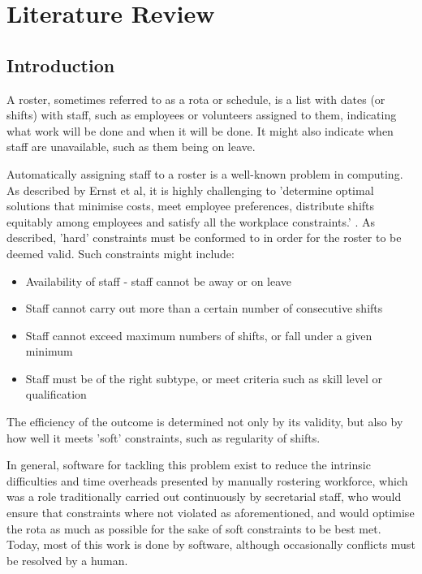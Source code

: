 \chapter{Literature Review}

\section{Introduction}

A roster, sometimes referred to as a rota or schedule, is a list with dates (or shifts) with staff, such as employees or volunteers assigned to them, indicating what work will be done and when it will be done. It might also indicate when staff are unavailable, such as them being on leave. \cite{CollinsRoster}

Automatically assigning staff to a roster is a well-known problem in computing. As described by Ernst et al, it is highly challenging to 'determine optimal solutions that minimise costs, meet employee preferences, distribute shifts equitably among employees and satisfy all the workplace constraints.' \cite{ERNST20043}. As described, 'hard' constraints must be conformed to in order for the roster to be deemed valid. Such constraints might include: \cite{Chen2016}

\begin{itemize}
    \item Availability of staff - staff cannot be away or on leave
    \item Staff cannot carry out more than a certain number of consecutive shifts
    \item Staff cannot exceed maximum numbers of shifts, or fall under a given minimum
    \item Staff must be of the right subtype, or meet criteria such as skill level or qualification
\end{itemize}

The efficiency of the outcome is determined not only by its validity, but also by how well it meets 'soft' constraints, such as regularity of shifts.

In general, software for tackling this problem exist to reduce the intrinsic difficulties and time overheads presented by manually rostering workforce, which was a role traditionally carried out continuously by secretarial staff, who would ensure that constraints where not violated as aforementioned, and would optimise the rota as much as possible for the sake of soft constraints to be best met. Today, most of this work is done by software, although occasionally conflicts must be resolved by a human. \cite{Maes1994AgentsTR}

